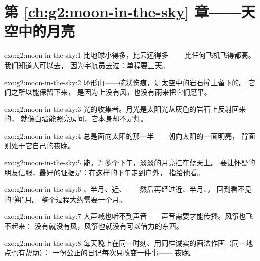 \section*{第 \ref{ch:g2:moon-in-the-sky} 章——天空中的月亮}

\begin{solution}{exo:g2:moon-in-the-sky:1}
比地球小得多，比云远得多——
比任何飞机飞得都高。我们知道人可以去，
因为宇航员去过：单程要三天。
\end{solution}

\begin{solution}{exo:g2:moon-in-the-sky:2}
环形山——碗状伤痕，是太空中的岩石撞上留下的。
它们之所以能保留下来，
是因为上没有风，也没有雨来把它们磨平。
\end{solution}

\begin{solution}{exo:g2:moon-in-the-sky:3}
光的收集者。月光是太阳光从灰色的岩石上反射回来的，
就像白墙能照亮房间，它本身却不是灯。
\end{solution}

\begin{solution}{exo:g2:moon-in-the-sky:4}
总是面向太阳的那一半——朝向太阳的一面明亮，
背面则处于它自己的夜晚。
\end{solution}

\begin{solution}{exo:g2:moon-in-the-sky:5}
能。许多个下午，淡淡的月亮挂在蓝天上。
要让怀疑的朋友信服，最好的证据是：在这样的下午走到户外，
指给他看。
\end{solution}

\begin{solution}{exo:g2:moon-in-the-sky:6}
、半月、近、——然后再经过近、半月、，
回到看不见的“朔”月。
整个过程大约需要一个月。
\end{solution}

\begin{solution}{exo:g2:moon-in-the-sky:7}
大声喊也听不到声音——声音需要才能传播。风筝也飞不起来：
没有就没有风，风筝也就没有可以借力的东西。
\end{solution}

\begin{solution}{exo:g2:moon-in-the-sky:8}
每天晚上在同一时刻、用同样诚实的画法作画（同一地点也有帮助）：
一份公正的日记每次只改变一件事——
夜晚。
\end{solution}

